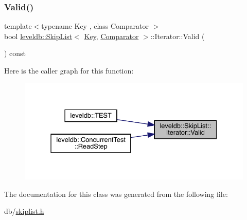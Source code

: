 \subsubsection{\texorpdfstring{Valid()}{Valid()}}
{\footnotesize\ttfamily template$<$typename Key , class Comparator $>$ \\
bool \mbox{\hyperlink{classleveldb_1_1_skip_list}{leveldb\+::\+Skip\+List}}$<$ \mbox{\hyperlink{namespaceleveldb_a7e9a9725b13fa0bd922d885280dfab95}{Key}}, \mbox{\hyperlink{structleveldb_1_1_comparator}{Comparator}} $>$\+::Iterator\+::\+Valid (\begin{DoxyParamCaption}{ }\end{DoxyParamCaption}) const\hspace{0.3cm}{\ttfamily [inline]}}

Here is the caller graph for this function\+:
\nopagebreak
\begin{figure}[H]
\begin{center}
\leavevmode
\includegraphics[width=331pt]{classleveldb_1_1_skip_list_1_1_iterator_a6eaf87cf7b2a58908ea3d8f9cccc606f_icgraph}
\end{center}
\end{figure}


The documentation for this class was generated from the following file\+:\begin{DoxyCompactItemize}
\item 
db/\mbox{\hyperlink{skiplist_8h}{skiplist.\+h}}\end{DoxyCompactItemize}
